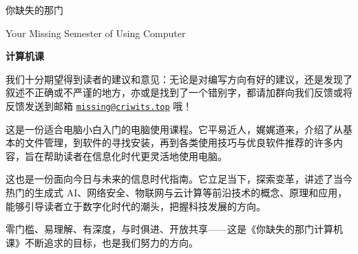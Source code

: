 \documentclass[a4paper]{book}
\date{\today}
\begin{document}
\maketitle

\frontmatter
{}
\thispagestyle{empty}
\begin{center}
  \vspace*{1.5cm}
  \fontsize{42pt}{54pt}\selectfont{}\textsf{你缺失的那门}\par
  \fontsize{18pt}{18pt}\selectfont{}\textsf{Your Missing Semester of Using Computer}\par
  \fontsize{54pt}{8pt}\selectfont{}\textbf{\textsf{计算机课}}\par
  \vspace*{2.6cm}
\end{center}

\begin{note}
  我们十分期望得到读者的建议和意见：无论是对编写方向有好的建议，还是发现了叙述不正确或不严谨的地方，亦或是找到了一个错别字，都请加群向我们反馈或将反馈发送到邮箱 \href{mailto:missing@criwits.top}{\texttt{missing@criwits.top}} 哦！
\end{note}

这是一份适合电脑小白入门的电脑使用课程。它平易近人，娓娓道来，介绍了从基本的文件管理，到软件的寻找安装，再到各类使用技巧与优良软件推荐的许多内容，旨在帮助读者在信息化时代更灵活地使用电脑。

这也是一份面向今日与未来的信息时代指南。它立足当下，探索变革，讲述了当今热门的生成式 AI、网络安全、物联网与云计算等前沿技术的概念、原理和应用，能够引导读者立于数字化时代的潮头，把握科技发展的方向。

零门槛、易理解、有深度，与时俱进、开放共享——这是《你缺失的那门计算机课》不断追求的目标，也是我们努力的方向。
\end{document}

